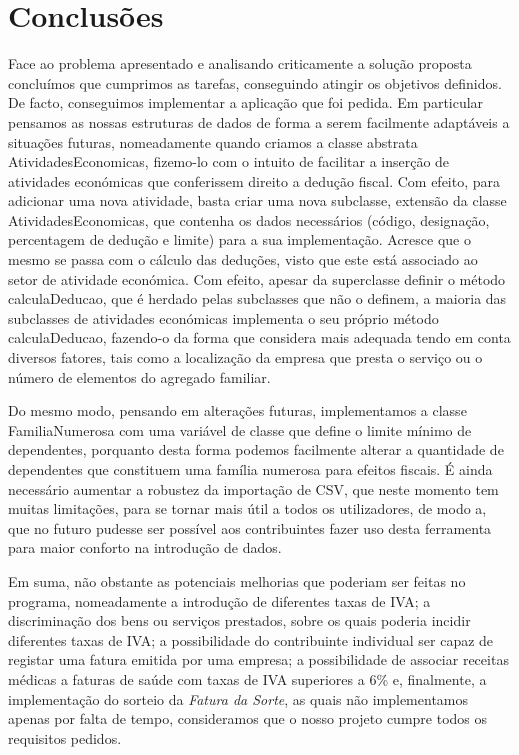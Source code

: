 \documentclass[a4paper]{article}
\begin{document}
\section{Conclusões}
\label{sec:conclusao}


Face ao problema apresentado e analisando criticamente a solução proposta concluímos
que cumprimos as tarefas, conseguindo atingir os objetivos definidos.
De facto, conseguimos implementar a aplicação que foi pedida.
Em particular pensamos as nossas estruturas de dados de forma a serem facilmente
adaptáveis a situações futuras, nomeadamente quando criamos a classe abstrata AtividadesEconomicas,
fizemo-lo com o intuito de facilitar a inserção de atividades económicas que conferissem direito
a dedução fiscal. Com efeito, para adicionar uma nova atividade, basta criar uma
nova subclasse, extensão da classe AtividadesEconomicas, que contenha
os dados necessários (código, designação, percentagem de dedução e limite) para a sua
implementação. Acresce que o mesmo se passa com o cálculo das deduções, visto que
este está associado ao setor de atividade económica. Com efeito, apesar da superclasse
definir o método calculaDeducao, que é herdado pelas subclasses que não o definem,
a maioria das subclasses de atividades económicas implementa o seu próprio método
calculaDeducao, fazendo-o da forma que considera mais adequada tendo em conta
diversos fatores, tais como a localização da empresa que presta o serviço ou o número
de elementos do agregado familiar.

Do mesmo modo, pensando em alterações futuras, implementamos a classe FamiliaNumerosa
com uma variável de classe que define o limite mínimo de dependentes, porquanto desta
forma podemos facilmente alterar a quantidade de dependentes que constituem uma família
numerosa para efeitos fiscais.
É ainda necessário aumentar a robustez da importação de CSV, que neste momento
tem muitas limitações, para se tornar mais útil a todos os utilizadores, de modo
a, que no futuro pudesse ser possível aos contribuintes fazer uso desta
ferramenta para maior conforto na introdução de dados.


Em suma, não obstante as potenciais melhorias que poderiam ser feitas no
programa, nomeadamente a introdução de diferentes taxas de IVA;
a discriminação dos bens ou serviços prestados, sobre os quais poderia incidir diferentes
taxas de IVA; a possibilidade do contribuinte individual ser capaz
de registar uma fatura emitida por uma empresa; a possibilidade de associar receitas
médicas a faturas de saúde com taxas de IVA superiores a 6\% e, finalmente, a implementação
do sorteio da \emph{Fatura da Sorte}, as quais não implementamos apenas por falta de tempo,
consideramos que o nosso projeto cumpre todos os requisitos pedidos.
\end{document}
